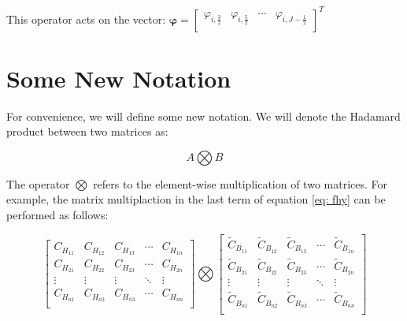 \documentclass[11pt,a4paper]{article}
\begin{document}
\begin{flushleft}
This operator acts on the vector: $ \mathbf{\varphi}= \begin{bmatrix} \varphi_{i,\frac{3}{2}} & \varphi_{i,\frac{5}{2}} & \cdots & \varphi_{i, J-\frac{1}{2}}\\ \end{bmatrix}^T$ 

\section{Some New Notation}
For convenience, we will define some new notation. We will denote the Hadamard product between two matrices as:

$$A \bigotimes B$$

The operator $\bigotimes$ refers to the element-wise multiplication of two matrices. For example, the matrix multiplaction in the last term of equation \ref{eq: fhy} can be performed as follows:

\begin{equation}
\begin{bmatrix}
C_{H_{11}} & C_{H_{12}}   & C_{H_{13}}  & \cdots & C_{H_{1n}}  \\ 
C_{H_{21}} & C_{H_{22}}   & C_{H_{23}}  & \cdots & C_{H_{2n}}  \\ 
\vdots 		 & \vdots  &\vdots  & \ddots  & \vdots \\ 
C_{H_{n1}} & C_{H_{n2}}   & C_{H_{n3}}  & \cdots & C_{H_{nn}}  \\ 
\end{bmatrix}
\bigotimes
\begin{bmatrix}
\widetilde C_{B_{11}} & \widetilde C_{B_{12}}   & \widetilde C_{B_{13}}  & \cdots & \widetilde C_{B_{1n}}  \\ 
\widetilde C_{B_{21}} & \widetilde C_{B_{22}}   & \widetilde C_{B_{23}}  & \cdots & \widetilde C_{B_{2n}}  \\ 
\vdots 		 & \vdots  &\vdots  & \ddots  & \vdots \\ 
\widetilde C_{B_{n1}} & \widetilde C_{B_{n2}}   & \widetilde C_{B_{n3}}  & \cdots & \widetilde C_{B_{nn}}  \\ 
\end{bmatrix}
\end{equation}

\begin{comment}

This will produce \textsc{small caps} text.\\


\end{comment}
\end{flushleft}
\end{document}
